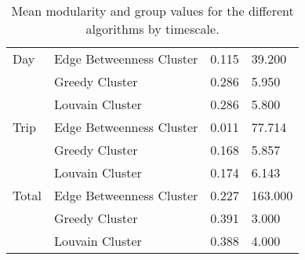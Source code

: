 \documentclass[11pt]{article}
\begin{document}
\begin{table}[H]
	\centering{}
	\caption{Mean modularity and group values for the different algorithms by timescale.}
	\begin{tabular}{llll}
		\hiderowcolors
		\toprule
		\rotatebox{0}{Timescale} & \rotatebox{0}{Algorithm} & \rotatebox{0}{Modularity} & \rotatebox{0}{Groups}\\
		\midrule
		\showrowcolors
		Day & Edge Betweenness Cluster & 0.115 & 39.200\\
		& Greedy Cluster & 0.286 & 5.950\\
		& Louvain Cluster & 0.286 & 5.800\\
		Trip & Edge Betweenness Cluster & 0.011 & 77.714\\
		& Greedy Cluster & 0.168 & 5.857\\
		\addlinespace
		& Louvain Cluster & 0.174 & 6.143\\
		Total & Edge Betweenness Cluster & 0.227 & 163.000\\
		& Greedy Cluster & 0.391 & 3.000\\
		& Louvain Cluster & 0.388 & 4.000\\
		\bottomrule
	\end{tabular}
	
	\label{Fig:Data2}
\end{table}
\end{document}

